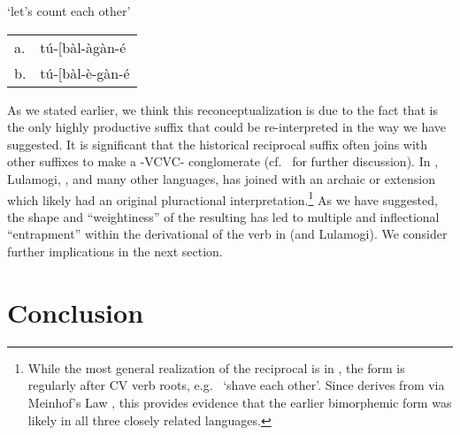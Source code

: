 \documentclass[output=paper,
modfonts
]{LSP/langsci}
\begin{document}
\ea `let's count each other'\\
\begin{tabular}[t]{@{}ll}
a. & tú-{[}bàl-àgàn-é \\
b. & tú-{[}bàl-è-gàn-é \\
\end{tabular}
\z

\noindent As we stated earlier, we think this reconceptualization is due to the
fact that  is the only highly productive suffix that could
be re-interpreted in the way we have suggested. It is significant that
the historical  reciprocal suffix  often joins with
other suffixes to make a -VCVC- conglomerate (cf.\ \citealt[1289--91]{bostoen2010} for further discussion). In , Lulamogi, , and
many other  languages,  has joined with an archaic
 or  extension which likely had an original
pluractional interpretation.\footnote{While the most general realization
  of the reciprocal is  in , the form is regularly
   after CV verb roots, e.g.\  `shave each
  other'. Since  derives from  via
  Meinhof's Law \citep[192--193]{katamba1991}, this provides evidence
  that the earlier bimorphemic form was likely  in all
  three closely related languages.} As we have suggested, the shape and
``weightiness'' of the resulting  has led to multiple
 and inflectional ``entrapment'' within the derivational
 of the verb  in  (and Lulamogi). We consider
further implications in the next section.

\section{Conclusion}\label{sec:hyman:6}
\end{document}
